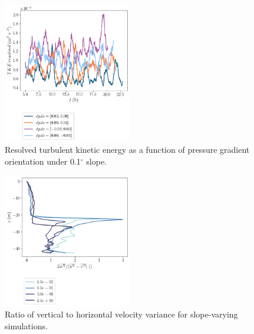 \begin{figure}[H]
    \centering
    \includegraphics[width=0.5\textwidth]{Figures/e_res_cmp_dpdy_dpdx_t.png}
    \caption{Resolved turbulent kinetic energy as a function of pressure gradient orientation under 0.1$^{\circ}$ slope.}
    \label{fig:e_orientation}
\end{figure}

\begin{figure}[H]
    \centering
    \includegraphics[width=0.5\textwidth]{Figures/vel_var_ratio_cmp_dslope_40hr_tav1_z_profile.png}
    \caption{Ratio of vertical to horizontal velocity variance for slope-varying simulations.}
    \label{fig:vel_var_ratio}
\end{figure}


